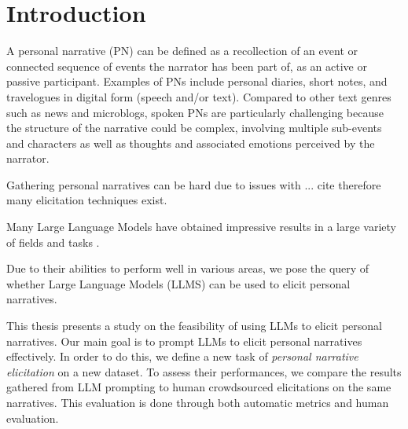 \chapter{Introduction}
\label{cha:intro}
A personal narrative (PN) can be defined as a recollection of an event or connected sequence of events the narrator has been part of, as an active or passive participant. Examples of PNs include personal diaries, short notes, and travelogues in digital form (speech and/or text). Compared to other text genres such as news and microblogs, spoken PNs are particularly challenging because the structure of the narrative could be complex, involving multiple sub-events and characters as well as thoughts and associated emotions perceived by the narrator.

Gathering personal narratives can be hard due to issues with ... cite{} therefore many elicitation techniques exist.

Many Large Language Models have obtained impressive results in a large variety of fields and tasks \cite{bubeck2023sparks}.

Due to their abilities to perform well in various areas, we pose the query of whether Large Language Models (LLMS) can be used to elicit personal narratives. 

This thesis presents a study on the feasibility of using LLMs to elicit personal narratives. Our main goal is to prompt LLMs to elicit personal narratives effectively. In order to do this, we define a new task of \emph{personal narrative elicitation} on a new dataset. To assess their performances, we compare the results gathered from LLM prompting to human crowdsourced elicitations on the same narratives. This evaluation is done through both automatic metrics and human evaluation. %


